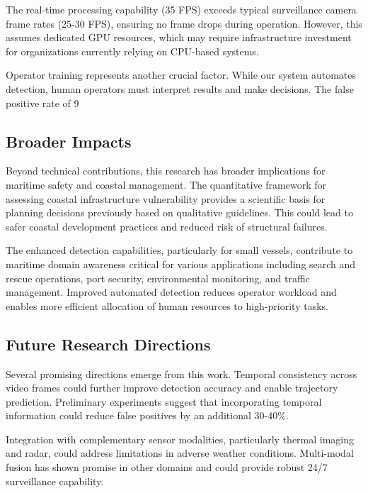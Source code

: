 \documentclass[10pt]{article}
\begin{document}
The real-time processing capability (35 FPS) exceeds typical surveillance camera frame rates (25-30 FPS), ensuring no frame drops during operation. However, this assumes dedicated GPU resources, which may require infrastructure investment for organizations currently relying on CPU-based systems.

Operator training represents another crucial factor. While our system automates detection, human operators must interpret results and make decisions. The false positive rate of 9%

\subsection{Broader Impacts}

Beyond technical contributions, this research has broader implications for maritime safety and coastal management. The quantitative framework for assessing coastal infrastructure vulnerability provides a scientific basis for planning decisions previously based on qualitative guidelines. This could lead to safer coastal development practices and reduced risk of structural failures.

The enhanced detection capabilities, particularly for small vessels, contribute to maritime domain awareness critical for various applications including search and rescue operations, port security, environmental monitoring, and traffic management. Improved automated detection reduces operator workload and enables more efficient allocation of human resources to high-priority tasks.

\subsection{Future Research Directions}

Several promising directions emerge from this work. Temporal consistency across video frames could further improve detection accuracy and enable trajectory prediction. Preliminary experiments suggest that incorporating temporal information could reduce false positives by an additional 30-40\%.

Integration with complementary sensor modalities, particularly thermal imaging and radar, could address limitations in adverse weather conditions. Multi-modal fusion has shown promise in other domains and could provide robust 24/7 surveillance capability.
\end{document}

